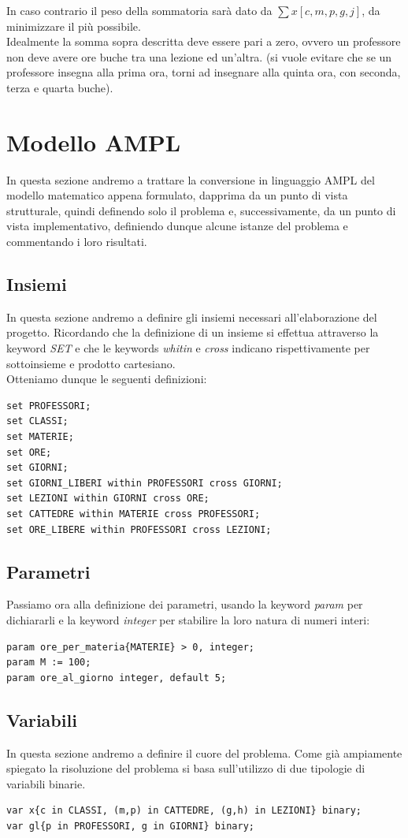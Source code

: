\documentclass{article}
\begin{document}
In caso contrario il peso della sommatoria sarà dato da $\sum{}x[c,m,p,g,j]$, da minimizzare il più possibile.
\\Idealmente la somma sopra descritta deve essere pari a zero, ovvero un professore non deve avere ore buche tra una lezione ed un'altra. (si vuole evitare che se un professore insegna alla prima ora, torni ad insegnare alla quinta ora, con seconda, terza e quarta buche).

\section{Modello AMPL}
In questa sezione andremo a trattare la conversione in linguaggio AMPL del modello matematico appena formulato, dapprima da un punto di vista strutturale, quindi definendo solo il problema e, successivamente, da un punto di vista implementativo, definiendo dunque alcune istanze del problema e commentando i loro risultati.
\subsection{Insiemi}
In questa sezione andremo a definire gli insiemi necessari all'elaborazione del progetto. Ricordando che la definizione di un insieme si effettua attraverso la keyword \emph{SET} e che le keywords \emph{whitin} e \emph{cross} indicano rispettivamente per sottoinsieme e prodotto cartesiano. 
\\Otteniamo dunque le seguenti definizioni:
\begin{verbatim}
set PROFESSORI;
set CLASSI;
set MATERIE;
set ORE;
set GIORNI;
set GIORNI_LIBERI within PROFESSORI cross GIORNI;
set LEZIONI within GIORNI cross ORE;
set CATTEDRE within MATERIE cross PROFESSORI;
set ORE_LIBERE within PROFESSORI cross LEZIONI;
\end{verbatim}
\subsection{Parametri}
Passiamo ora alla definizione dei parametri, usando la keyword \emph{param} per dichiararli e la keyword \emph{integer} per stabilire la loro natura di numeri interi:
\begin{verbatim}
param ore_per_materia{MATERIE} > 0, integer;
param M := 100;
param ore_al_giorno integer, default 5;
\end{verbatim}


\subsection{Variabili}
In questa sezione andremo a definire il cuore del problema. Come già ampiamente spiegato la risoluzione del problema si basa sull'utilizzo di due tipologie di variabili binarie.
\begin{verbatim}
var x{c in CLASSI, (m,p) in CATTEDRE, (g,h) in LEZIONI} binary;
var gl{p in PROFESSORI, g in GIORNI} binary;
\end{verbatim}
\end{document}
